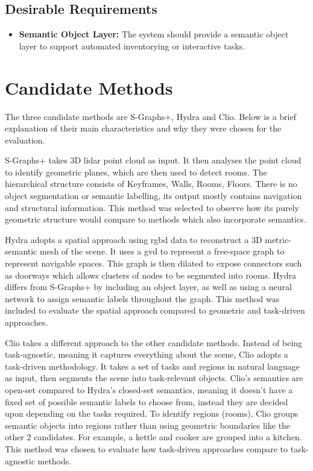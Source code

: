 \subsection{Desirable Requirements}\label{sec:spec:desirable}
\begin{itemize}
    \item \textbf{Semantic Object Layer:} The system should provide a semantic object layer to support automated inventorying or interactive tasks.
\end{itemize}


\section{Candidate Methods}\label{sec:methods}

The three candidate methods are S-Graphs+\cite{s_graphs_plus}, Hydra\cite{hydra} and Clio\cite{clio}. Below is a brief explanation of their main characteristics and why they were chosen for the evaluation.

S-Graphs+ takes 3D \acrshort{lidar} point cloud as input. It then analyses the point cloud to identify geometric planes, which are then used to detect rooms. The hierarchical structure consists of Keyframes, Walls, Rooms, Floors. There is no object segmentation or semantic labelling, its output mostly contains navigation and structural information. This method was selected to observe how its purely geometric structure would compare to methods which also incorporate semantics.

Hydra adopts a spatial approach using \acrshort{rgbd} data to reconstruct a 3D metric-semantic mesh of the scene. It uses a \gls{gvd} to represent a free-space graph to represent navigable spaces. This graph is then dilated to expose connectors such as doorways which allows clusters of nodes to be segmented into rooms. Hydra differs from S-Graphs+ by including an object layer, as well as using a neural network to assign semantic labels throughout the graph. This method was included to evaluate the spatial approach compared to geometric and task-driven approaches.

Clio takes a different approach to the other candidate methods. Instead of being task-agnostic, meaning it captures everything about the scene, Clio adopts a task-driven methodology. It takes a set of tasks and regions in natural language as input, then segments the scene into task-relevant objects. Clio’s semantics are open-set compared to Hydra’s closed-set semantics, meaning it doesn’t have a fixed set of possible semantic labels to choose from, instead they are decided upon depending on the tasks required. To identify regions (rooms), Clio groups semantic objects into regions rather than using geometric boundaries like the other 2 candidates. For example, a kettle and cooker are grouped into a kitchen. This method was chosen to evaluate how task-driven approaches compare to task-agnostic methods.

